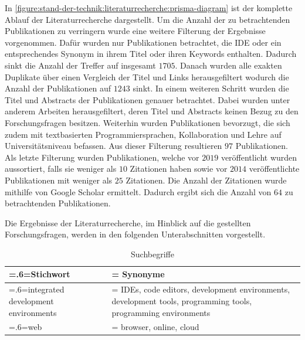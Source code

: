 In \autoref{figure:stand-der-technik:literaturrecherche:prisma-diagram} ist der komplette Ablauf der Literaturrecherche dargestellt. Um die Anzahl der zu betrachtenden Publikationen zu verringern wurde eine weitere Filterung der Ergebnisse vorgenommen. Dafür wurden nur Publikationen betrachtet, die IDE oder ein entsprechendes Synonym in ihrem Titel oder ihren Keywords enthalten. Dadurch sinkt die Anzahl der Treffer auf insgesamt $1705$. Danach wurden alle exakten Duplikate über einen Vergleich der Titel und Links herausgefiltert wodurch die Anzahl der Publikationen auf $1243$ sinkt. In einem weiteren Schritt wurden die Titel und Abstracts der Publikationen genauer betrachtet. Dabei wurden unter anderem Arbeiten herausgefiltert, deren Titel und Abstracts keinen Bezug zu den Forschungsfragen besitzen. Weiterhin wurden Publikationen bevorzugt, die sich zudem mit textbasierten Programmiersprachen, Kollaboration und Lehre auf Universitätsniveau befassen. Aus dieser Filterung resultieren $97$ Publikationen. Als letzte Filterung wurden Publikationen, welche vor $2019$ veröffentlicht wurden aussortiert, falls sie weniger als $10$ Zitationen haben sowie vor $2014$ veröffentlichte Publikationen mit weniger als $25$ Zitationen. Die Anzahl der Zitationen wurde mithilfe von Google Scholar \cite{noauthor_google-scholar_nodate} ermittelt. Dadurch ergibt sich die Anzahl von $64$ zu betrachtenden Publikationen.

Die Ergebnisse der Literaturrecherche, im Hinblick auf die gestellten Forschungsfragen, werden in den folgenden Unterabschnitten vorgestellt.

\begin{table}[tbp]
    \centering
    \begin{tabularx}{\textwidth}{>{\hsize=.6\hsize\linewidth=\hsize}X
            >{\hsize=1.4\hsize\linewidth=\hsize}X}
        \toprule
        Stichwort                           & Synonyme                                                                                                     \\
        \midrule
        integrated development environments & IDEs, code editors, development environments, development tools, programming tools, programming environments \\
        web                                 & browser, online, cloud                                                                                       \\
        \bottomrule
    \end{tabularx}
    \caption{Suchbegriffe}
    \label{table:search-terms}
\end{table}

